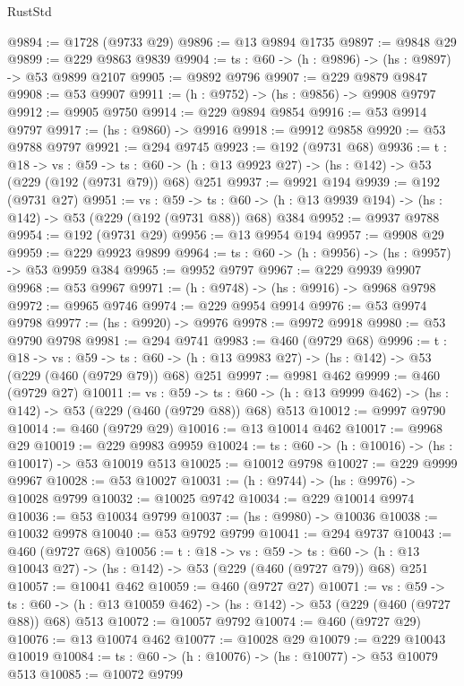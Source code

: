 \begin{lexlean}{RustStd}
\begin{coremodule}
@9894 := @1728 (@9733 @29)
@9896 := @13 @9894 @1735
@9897 := @9848 @29
@9899 := @229 @9863 @9839
@9904 := {ts : @60} -> (h : @9896) -> (hs : @9897) -> @53 @9899 @2107
@9905 := @9892 @9796
@9907 := @229 @9879 @9847
@9908 := @53 @9907
@9911 := (h : @9752) -> (hs : @9856) -> @9908 @9797
@9912 := @9905 @9750
@9914 := @229 @9894 @9854
@9916 := @53 @9914 @9797
@9917 := (hs : @9860) -> @9916
@9918 := @9912 @9858
@9920 := @53 @9788 @9797
@9921 := @294 @9745
@9923 := @192 (@9731 @68)
@9936 := {t : @18} ->
  {vs : @59} ->
  {ts : @60} -> (h : @13 @9923 @27) -> (hs : @142) -> @53 (@229 (@192 (@9731 @79)) @68) @251
@9937 := @9921 @194
@9939 := @192 (@9731 @27)
@9951 := {vs : @59} ->
  {ts : @60} -> (h : @13 @9939 @194) -> (hs : @142) -> @53 (@229 (@192 (@9731 @88)) @68) @384
@9952 := @9937 @9788
@9954 := @192 (@9731 @29)
@9956 := @13 @9954 @194
@9957 := @9908 @29
@9959 := @229 @9923 @9899
@9964 := {ts : @60} -> (h : @9956) -> (hs : @9957) -> @53 @9959 @384
@9965 := @9952 @9797
@9967 := @229 @9939 @9907
@9968 := @53 @9967
@9971 := (h : @9748) -> (hs : @9916) -> @9968 @9798
@9972 := @9965 @9746
@9974 := @229 @9954 @9914
@9976 := @53 @9974 @9798
@9977 := (hs : @9920) -> @9976
@9978 := @9972 @9918
@9980 := @53 @9790 @9798
@9981 := @294 @9741
@9983 := @460 (@9729 @68)
@9996 := {t : @18} ->
  {vs : @59} ->
  {ts : @60} -> (h : @13 @9983 @27) -> (hs : @142) -> @53 (@229 (@460 (@9729 @79)) @68) @251
@9997 := @9981 @462
@9999 := @460 (@9729 @27)
@10011 := {vs : @59} ->
  {ts : @60} -> (h : @13 @9999 @462) -> (hs : @142) -> @53 (@229 (@460 (@9729 @88)) @68) @513
@10012 := @9997 @9790
@10014 := @460 (@9729 @29)
@10016 := @13 @10014 @462
@10017 := @9968 @29
@10019 := @229 @9983 @9959
@10024 := {ts : @60} -> (h : @10016) -> (hs : @10017) -> @53 @10019 @513
@10025 := @10012 @9798
@10027 := @229 @9999 @9967
@10028 := @53 @10027
@10031 := (h : @9744) -> (hs : @9976) -> @10028 @9799
@10032 := @10025 @9742
@10034 := @229 @10014 @9974
@10036 := @53 @10034 @9799
@10037 := (hs : @9980) -> @10036
@10038 := @10032 @9978
@10040 := @53 @9792 @9799
@10041 := @294 @9737
@10043 := @460 (@9727 @68)
@10056 := {t : @18} ->
  {vs : @59} ->
  {ts : @60} -> (h : @13 @10043 @27) -> (hs : @142) -> @53 (@229 (@460 (@9727 @79)) @68) @251
@10057 := @10041 @462
@10059 := @460 (@9727 @27)
@10071 := {vs : @59} ->
  {ts : @60} -> (h : @13 @10059 @462) -> (hs : @142) -> @53 (@229 (@460 (@9727 @88)) @68) @513
@10072 := @10057 @9792
@10074 := @460 (@9727 @29)
@10076 := @13 @10074 @462
@10077 := @10028 @29
@10079 := @229 @10043 @10019
@10084 := {ts : @60} -> (h : @10076) -> (hs : @10077) -> @53 @10079 @513
@10085 := @10072 @9799

\end{coremodule}
\end{lexlean}
